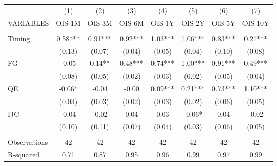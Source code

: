 \begin{tabular}{lccccccc} \hline
 & (1) & (2) & (3) & (4) & (5) & (6) & (7) \\
VARIABLES & OIS 1M & OIS 3M & OIS 6M & OIS 1Y & OIS 2Y & OIS 5Y & OIS 10Y \\ \hline
 &  &  &  &  &  &  &  \\
Timing & 0.58*** & 0.91*** & 0.92*** & 1.03*** & 1.06*** & 0.83*** & 0.21*** \\
 & (0.13) & (0.07) & (0.04) & (0.05) & (0.04) & (0.10) & (0.08) \\
FG & -0.05 & 0.14** & 0.48*** & 0.74*** & 1.00*** & 0.91*** & 0.49*** \\
 & (0.08) & (0.05) & (0.02) & (0.03) & (0.02) & (0.05) & (0.04) \\
QE & -0.06* & -0.04 & -0.00 & 0.09*** & 0.21*** & 0.73*** & 1.10*** \\
 & (0.03) & (0.03) & (0.02) & (0.03) & (0.02) & (0.06) & (0.05) \\
IJC & -0.04 & -0.02 & 0.04 & 0.03 & -0.06* & 0.04 & -0.02 \\
 & (0.10) & (0.11) & (0.07) & (0.04) & (0.03) & (0.06) & (0.05) \\
 &  &  &  &  &  &  &  \\
Observations & 42 & 42 & 42 & 42 & 42 & 42 & 42 \\
 R-squared & 0.71 & 0.87 & 0.95 & 0.96 & 0.99 & 0.97 & 0.99 \\ \hline
\end{tabular}
